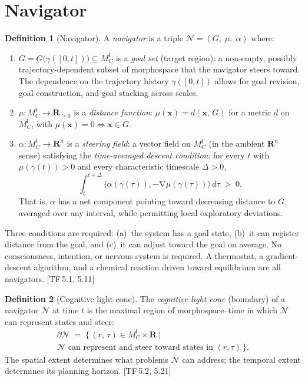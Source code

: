 \documentclass[10pt]{article}
\theoremstyle{definition}
\newtheorem{definition}{Definition}[section]
\theoremstyle{plain}
\theoremstyle{remark}
\newcommand{\MC}{M^{\mathsf{I}}_C}          %
\providecommand{\Rn}{}
\renewcommand{\Rn}{\mathbf{R}^n}            %
\providecommand{\R}{}
\renewcommand{\R}{\mathbf{R}}               %
\newcommand{\Nav}{\mathcal{N}}               %
\newcommand{\inner}[2]{\langle #1, #2 \rangle}
\DeclareMathOperator{\grad}{\nabla}
\newcommand{\TF}[1]{\textnormal{[TF\,#1]}}  %
\begin{document}
\newpage
\section{Navigator}\label{sec:navigator}

\begin{definition}[Navigator]\label{def:5.1}
A \emph{navigator} is a triple
$\Nav = (G,\; \mu,\; \alpha)$
where:
\begin{enumerate}[label=(\alph*),nosep]
  \item $G = G\bigl(\gamma([0,t])\bigr) \subseteq \MC$ is a
    \emph{goal set} (target region): a non-empty, possibly
    trajectory-dependent subset of morphospace that the navigator
    steers toward. The dependence on the trajectory history
    $\gamma([0,t])$ allows for goal revision, goal construction,
    and goal stacking across scales.
  \item $\mu : \MC \to \R_{\geq 0}$ is a \emph{distance function}:
    $\mu(\bm{x}) = d(\bm{x},\, G)$ for a metric $d$ on $\MC$, with
    $\mu(\bm{x}) = 0 \iff \bm{x} \in G$.
  \item $\alpha : \MC \to \Rn$ is a \emph{steering field}: a
    vector field on $\MC$ (in the ambient $\Rn$ sense)
    satisfying the \emph{time-averaged descent condition}:
    for every $t$ with $\mu(\gamma(t)) > 0$ and every
    characteristic timescale $\Delta > 0$,
    \begin{equation}\label{eq:steering}
      \int_t^{t+\Delta}
        \inner{\alpha(\gamma(\tau))}{-\grad\mu(\gamma(\tau))}
      \, d\tau \;>\; 0.
    \end{equation}
    That is, $\alpha$ has a net component pointing toward
    decreasing distance to $G$, averaged over any interval,
    while permitting local exploratory deviations.
\end{enumerate}

\medskip\noindent
Three conditions are required: (a)~the system has a goal state,
(b)~it can register distance from the goal, and (c)~it can adjust
toward the goal on average. No consciousness, intention, or nervous
system is required. A thermostat, a gradient-descent algorithm, and a
chemical reaction driven toward equilibrium are all navigators. \TF{5.1, 5.11}
\end{definition}

\begin{definition}[Cognitive light cone]\label{def:5.2}
The \emph{cognitive light cone} (boundary) of a navigator
$\Nav$ at time $t$ is the maximal region of morphospace--time
in which $\Nav$ can represent states and steer:
\begin{multline}\label{eq:lightcone}
  \partial\Nav \;=\;
  \bigl\{\, (r,\, \tau) \in \MC \times \R
    \;\big|\; \\
    \Nav \text{ can represent and steer}
    \text{ toward states in } (r, \tau)
  \,\bigr\}.
\end{multline}
The spatial extent determines what problems $\Nav$ can address; the
temporal extent determines its planning horizon. \TF{5.2, 5.21}
\end{definition}
\end{document}
